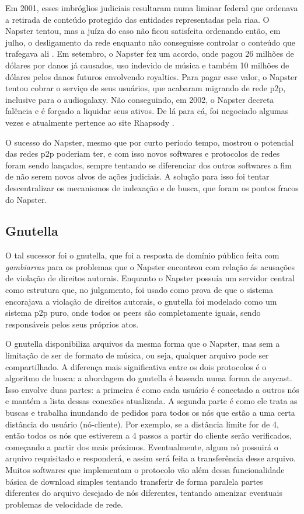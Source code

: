 Em 2001, esses imbróglios judiciais resultaram numa liminar federal que ordenava a
retirada de conteúdo protegido das entidades representadas pela \gls*{riaa}. O Napster
tentou, mas a juíza do caso não ficou satisfeita ordenando então, em julho, o
desligamento da rede enquanto não conseguisse controlar o conteúdo que trafegava ali
\cite{site:wiki-napster}. Em setembro, o Napster fez um acordo, onde pagou 26 milhões de
dólares por danos já causados, uso indevido de música e também 10 milhões de dólares
pelos danos futuros envolvendo royalties. Para pagar esse valor, o Napster tentou cobrar
o serviço de seus usuários, que acabaram migrando de rede \gls*{p2p}, inclusive para o
\gls*{audiogalaxy}. Não conseguindo, em 2002, o Napster decreta falência e é forçado a
liquidar seus ativos. De lá para cá, foi negociado algumas vezes e atualmente pertence
ao site Rhapsody \cite{site:napster-rhapsody}.

O sucesso do Napster, mesmo que por curto período tempo, mostrou o potencial das redes
\gls*{p2p} poderiam ter, e com isso novos softwares e protocolos de redes foram sendo
lançados, sempre tentando se diferenciar dos outros softwares a fim de não serem novos
alvos de ações judiciais. A solução para isso foi tentar descentralizar os mecanismos de
indexação e de busca, que foram os pontos fracos do Napster.

\subsection{Gnutella}

O tal sucessor foi o \gls{gnutella}, que foi a resposta de domínio público feita com
\emph{gambiarras} para os problemas que o Napster encontrou com relação ás acusações de
violação de direitos autorais. Enquanto o Napster possuía um servidor central como
estrutura que, no julgamento, foi usado como prova de que o sistema encorajava a
violação de direitos autorais, o \gls*{gnutella} foi modelado como um sistema \gls*{p2p}
puro, onde todos os \glspl*{peer} são completamente iguais, sendo responsáveis pelos
seus próprios atos.

O \gls*{gnutella} disponibiliza arquivos da mesma forma que o Napster, mas sem a
limitação de ser de formato de música, ou seja, qualquer arquivo pode ser compartilhado.
A diferença mais significativa entre os dois protocolos é o algoritmo de busca: a
abordagem do \gls*{gnutella} é baseada numa forma de \gls{anycast}. Isso envolve duas
partes: a primeira é como cada usuário é conectado a outros nós e mantém a lista dessas
conexões atualizada. A segunda parte é como ele trata as buscas e trabalha inundando de
pedidos para todos os nós que estão a uma certa distância do usuário (nó-cliente). Por
exemplo, se a distância limite for de 4, então todos os nós que estiverem a 4 passos a
partir do cliente serão verificados, começando a partir dos mais próximos.
Eventualmente, algum nó possuirá o arquivo requisitado e responderá, e assim será feita
a transferência desse arquivo. Muitos softwares que implementam o protocolo vão além
dessa funcionalidade básica de download simples tentando transferir de forma paralela
partes diferentes do arquivo desejado de nós diferentes, tentando amenizar eventuais
problemas de velocidade de rede.

